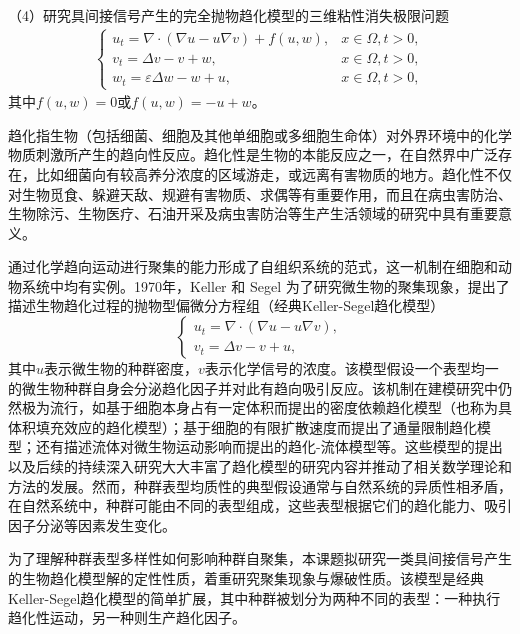 \documentclass[12pt]{article}
\begin{document}
（4）研究具间接信号产生的完全抛物趋化模型的三维粘性消失极限问题
\begin{align}
    \begin{cases}
      \label{sys: ks isp ppviscosity}
        u_t =  \nabla\cdot(\nabla u - u\nabla v) + f(u,w),& x\in\Omega, t>0,\\
        v_t =  \Delta v - v + w,& x\in\Omega,	 t>0,\\
        w_t  = \varepsilon \Delta w - w + u, & x\in\Omega, t > 0, 
    \end{cases}
\end{align}
其中$f(u,w)=0$或$f(u,w)=-u+w$。




趋化指生物（包括细菌、细胞及其他单细胞或多细胞生命体）对外界环境中的化学物质刺激所产生的趋向性反应。趋化性是生物的本能反应之一，在自然界中广泛存在，比如细菌向有较高养分浓度的区域游走，或远离有害物质的地方。趋化性不仅对生物觅食、躲避天敌、规避有害物质、求偶等有重要作用，而且在病虫害防治、生物除污、生物医疗、石油开采及病虫害防治等生产生活领域的研究中具有重要意义。

通过化学趋向运动进行聚集的能力形成了自组织系统的范式，这一机制在细胞和动物系统中均有实例。1970年，Keller 和 Segel 为了研究微生物的聚集现象，提出了描述生物趋化过程的抛物型偏微分方程组（经典Keller-Segel趋化模型）
\begin{equation}
    \begin{cases}
        u_t = \nabla \cdot(\nabla u - u\nabla v), \\ 
        v_t = \Delta v - v + u,
    \end{cases}
\end{equation} 
其中$u$表示微生物的种群密度，$v$表示化学信号的浓度。该模型假设一个表型均一的微生物种群自身会分泌趋化因子并对此有趋向吸引反应。该机制在建模研究中仍然极为流行，如基于细胞本身占有一定体积而提出的密度依赖趋化模型（也称为具体积填充效应的趋化模型）；基于细胞的有限扩散速度而提出了通量限制趋化模型；还有描述流体对微生物运动影响而提出的趋化-流体模型等。这些模型的提出以及后续的持续深入研究大大丰富了趋化模型的研究内容并推动了相关数学理论和方法的发展。然而，种群表型均质性的典型假设通常与自然系统的异质性相矛盾，在自然系统中，种群可能由不同的表型组成，这些表型根据它们的趋化能力、吸引因子分泌等因素发生变化。

为了理解种群表型多样性如何影响种群自聚集，本课题拟研究一类具间接信号产生的生物趋化模型解的定性性质，着重研究聚集现象与爆破性质。该模型是经典Keller-Segel趋化模型的简单扩展，其中种群被划分为两种不同的表型：一种执行趋化性运动，另一种则生产趋化因子。
\end{document}

